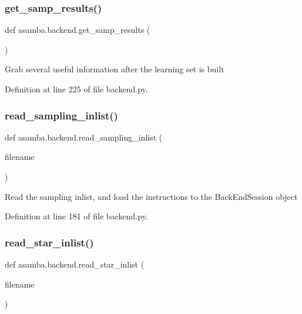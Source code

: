 \subsubsection{\texorpdfstring{get\+\_\+samp\+\_\+results()}{get\_samp\_results()}}
{\footnotesize\ttfamily def asamba.\+backend.\+get\+\_\+samp\+\_\+results (\begin{DoxyParamCaption}{ }\end{DoxyParamCaption})}

\begin{DoxyVerb}Grab several useful information after the learning set is built \end{DoxyVerb}
 

Definition at line 225 of file backend.\+py.

\mbox{\label{namespaceasamba_1_1backend_a0f88980e600c7c4bbf21efb7274dae9a}} 
\subsubsection{\texorpdfstring{read\+\_\+sampling\+\_\+inlist()}{read\_sampling\_inlist()}}
{\footnotesize\ttfamily def asamba.\+backend.\+read\+\_\+sampling\+\_\+inlist (\begin{DoxyParamCaption}\item[{}]{filename }\end{DoxyParamCaption})}

\begin{DoxyVerb}Read the sampling inlist, and load the instructions to the BackEndSession object
\end{DoxyVerb}
 

Definition at line 181 of file backend.\+py.

\mbox{\label{namespaceasamba_1_1backend_a4f5499ca7e69d4d088309b1f6a3e14b8}} 
\subsubsection{\texorpdfstring{read\+\_\+star\+\_\+inlist()}{read\_star\_inlist()}}
{\footnotesize\ttfamily def asamba.\+backend.\+read\+\_\+star\+\_\+inlist (\begin{DoxyParamCaption}\item[{}]{filename }\end{DoxyParamCaption})}

